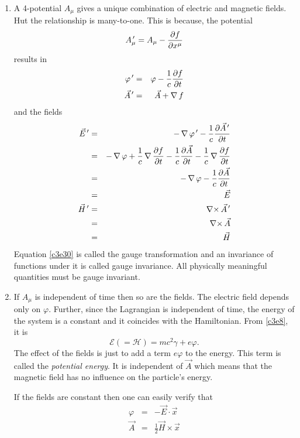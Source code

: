 \begin{enumerate}
\item A 4-potential $A_\mu$ gives a unique combination of electric and magnetic
fields. Hut the relationship is many-to-one. This is because, the potential
\begin{equation}\label{c3e30}
A_\mu^{\,\prime} = A_\mu - \frac{\partial{f}}{\partial{x^\mu}}
\end{equation}
results in
\begin{eqnarray}
\varphi^{\,\prime} &=& \varphi - \frac{1}{c}\frac{\partial{f}}{\partial{t}} \label{c3e31} \\
\vec{A}^{\,\prime} &=& \vec{A} + \operatorname{\nabla} f \label{c3e32}
\end{eqnarray}
and the fields
\begin{eqnarray}
\vec{E}^{\,\prime} &=& -\operatorname{\nabla}{\varphi^{\,\prime}} - \frac{1}{c}\frac{\partial{\vec{A}^{\,\prime}}}{\partial{t}} \nonumber \\
 &=& -\operatorname{\nabla}\varphi + \frac{1}{c}\operatorname{\nabla}\frac{\partial{f}}{\partial{t}} - 
      \frac{1}{c}\frac{\partial{\vec{A}}}{\partial{t}} - \frac{1}{c}\operatorname{\nabla}{\frac{\partial{f}}{\partial{t}}} \nonumber \\
 &=& -\operatorname{\nabla}\varphi - \frac{1}{c}\frac{\partial{\vec{A}}}{\partial{t}} \nonumber \\
 &=& \vec{E} \label{c3e33} \\
\vec{H}^{\,\prime} &=& \operatorname{\nabla\times}\vec{A}^{\,\prime} \nonumber \\
 &=& \operatorname{\nabla\times}\vec{A} \nonumber \\
 &=& \vec{H} \label{c3e34}
\end{eqnarray}
Equation \eqref{c3e30} is called the gauge transformation and an invariance of
functions under it is called gauge invariance. All physically meaningful quantities
must be gauge invariant.

\item If $A_\mu$ is independent of time then so are the fields. The electric field
depends only on $\varphi$. Further, since the Lagrangian is independent of time, the
energy of the system is a constant and it coincides with the Hamiltonian. From
\eqref{c3e8}, it is
\begin{equation}\label{c3e35}
\mathcal{E} (= \mathcal{H}) = mc^2\gamma + e\varphi.
\end{equation} 
The effect of the fields is just to add a term $e\varphi$ to the energy. This term
is called the \emph{potential energy}. It is independent of $\vec{A}$ which means
that the magnetic field has no influence on the particle's energy.

If the fields are constant then one can easily verify that
\begin{eqnarray}
\varphi &=& -\vec{E}\cdot\vec{x} \label{c3e36} \\
\vec{A} &=& \frac{1}{2}\vec{H} \times \vec{x} \label{c3e37}
\end{eqnarray}


\end{enumerate}
